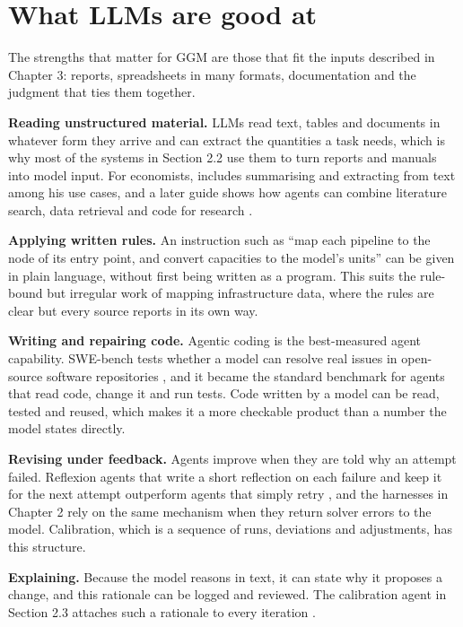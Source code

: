 \section{What LLMs are good at}

The strengths that matter for GGM are those that fit the inputs described in Chapter 3: reports, spreadsheets in many formats, documentation and the judgment that ties them together.

\textbf{Reading unstructured material.} LLMs read text, tables and documents in whatever form they arrive and can extract the quantities a task needs, which is why most of the systems in Section 2.2 use them to turn reports and manuals into model input.
For economists, \citet{korinek2023generative} includes summarising and extracting from text among his use cases, and a later guide shows how agents can combine literature search, data retrieval and code for research \citep{korinek2025ai}.

\textbf{Applying written rules.} An instruction such as ``map each pipeline to the node of its entry point, and convert capacities to the model's units'' can be given in plain language, without first being written as a program.
This suits the rule-bound but irregular work of mapping infrastructure data, where the rules are clear but every source reports in its own way.

\textbf{Writing and repairing code.} Agentic coding is the best-measured agent capability.
SWE-bench tests whether a model can resolve real issues in open-source software repositories \citep{jimenez2024swe}, and it became the standard benchmark for agents that read code, change it and run tests.
Code written by a model can be read, tested and reused, which makes it a more checkable product than a number the model states directly.

\textbf{Revising under feedback.} Agents improve when they are told why an attempt failed.
Reflexion agents that write a short reflection on each failure and keep it for the next attempt outperform agents that simply retry \citep{shinn2023reflexion}, and the harnesses in Chapter 2 rely on the same mechanism when they return solver errors to the model.
Calibration, which is a sequence of runs, deviations and adjustments, has this structure.

\textbf{Explaining.} Because the model reasons in text, it can state why it proposes a change, and this rationale can be logged and reviewed.
The calibration agent in Section 2.3 attaches such a rationale to every iteration \citep{gomezguillen2026agentic}.

